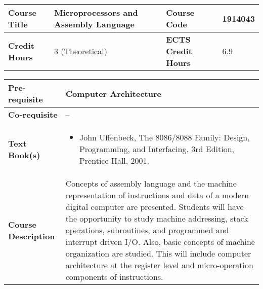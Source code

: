 \documentclass[12pt]{article}
\begin{document}
\bigskip
\bigskip



\begin{minipage}{\textwidth}
\begin{tabularx}{\textwidth}{|l|X|l|X|}
\hline
\textbf{Course Title}       &   Microprocessors and Assembly Language & \textbf{Course Code}       &  1914043 \\ \hline
\textbf{Credit Hours}       &   3 (Theoretical) & \textbf{ECTS Credit Hours}       &  6.9 \\ \hline
\end{tabularx}

\begin{tabularx}{\textwidth}{|l|X|}
\hline
\textbf{Pre-requisite}      &  Computer Architecture \\ \hline
\textbf{Co-requisite}       &  -- \\ \hline
\textbf{Text Book(s)}      & \begin{minipage}{.70\textwidth}
					\begin{itemize} \itemsep-0.4em
						\vspace{3mm}
						\item John Uffenbeck, The 8086/8088 Family: Design, Programming, and Interfacing. 3rd Edition, Prentice Hall, 2001.
						\vspace{3mm}
					\end{itemize}
				\end{minipage}  \\ \hline
\textbf{Course Description} & \begin{minipage}{.70\textwidth}
					\vspace{3mm}
					Concepts of assembly language and the machine representation of instructions and
					data of a modern digital computer are presented. Students will have the opportunity to study machine
					addressing, stack operations, subroutines, and programmed and interrupt driven I/O. Also, basic concepts of
					machine organization are studied. This will include computer architecture at the register level and micro-operation components of instructions.

					\vspace{3mm}
					\end{minipage} \\ \hline
\end{tabularx}
\end{minipage}


\bigskip
\bigskip
\end{document}
